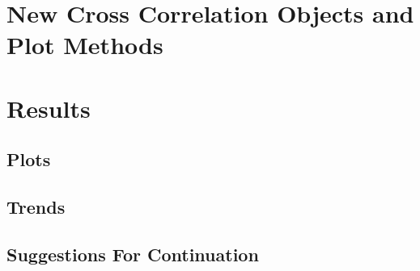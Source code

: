\documentclass[12pt,a4paper]{article}
\begin{document}
\section{New Cross Correlation Objects and Plot Methods}

\section{Results}
\subsection{Plots}
\subsection{Trends}\label{ssec:Trends}
\subsection{Suggestions For Continuation}


\newpage
\appendix
\section{}
\end{document}
